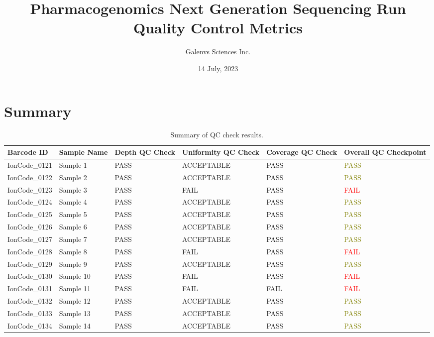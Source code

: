 \documentclass[
]{article}
\title{Pharmacogenomics Next Generation Sequencing Run Quality Control Metrics}
\author{Galenvs Sciences Inc.}
\date{14 July, 2023}
\begin{document}
\maketitle

\hypertarget{summary}{%
\section{Summary}\label{summary}}

\begin{longtable}[t]{>{\raggedright\arraybackslash}p{2cm}>{\raggedright\arraybackslash}p{2cm}>{\raggedright\arraybackslash}p{1.6cm}>{\raggedright\arraybackslash}p{3cm}>{\raggedright\arraybackslash}p{1.6cm}>{}l}
\caption{\label{tab:unnamed-chunk-1}Summary of QC check results.}\\
\toprule
Barcode ID & Sample Name & Depth QC Check & Uniformity QC Check & Coverage QC Check & Overall QC Checkpoint\\
\midrule
IonCode\_0121 & Sample 1 & PASS & ACCEPTABLE & PASS & \textcolor{olive}{PASS}\\
IonCode\_0122 & Sample 2 & PASS & ACCEPTABLE & PASS & \textcolor{olive}{PASS}\\
IonCode\_0123 & Sample 3 & PASS & FAIL & PASS & \textcolor{red}{FAIL}\\
IonCode\_0124 & Sample 4 & PASS & ACCEPTABLE & PASS & \textcolor{olive}{PASS}\\
IonCode\_0125 & Sample 5 & PASS & ACCEPTABLE & PASS & \textcolor{olive}{PASS}\\
\addlinespace
IonCode\_0126 & Sample 6 & PASS & ACCEPTABLE & PASS & \textcolor{olive}{PASS}\\
IonCode\_0127 & Sample 7 & PASS & ACCEPTABLE & PASS & \textcolor{olive}{PASS}\\
IonCode\_0128 & Sample 8 & PASS & FAIL & PASS & \textcolor{red}{FAIL}\\
IonCode\_0129 & Sample 9 & PASS & ACCEPTABLE & PASS & \textcolor{olive}{PASS}\\
IonCode\_0130 & Sample 10 & PASS & FAIL & PASS & \textcolor{red}{FAIL}\\
\addlinespace
IonCode\_0131 & Sample 11 & PASS & FAIL & FAIL & \textcolor{red}{FAIL}\\
IonCode\_0132 & Sample 12 & PASS & ACCEPTABLE & PASS & \textcolor{olive}{PASS}\\
IonCode\_0133 & Sample 13 & PASS & ACCEPTABLE & PASS & \textcolor{olive}{PASS}\\
IonCode\_0134 & Sample 14 & PASS & ACCEPTABLE & PASS & \textcolor{olive}{PASS}\\
\bottomrule
\end{longtable}
\newpage
\end{document}
